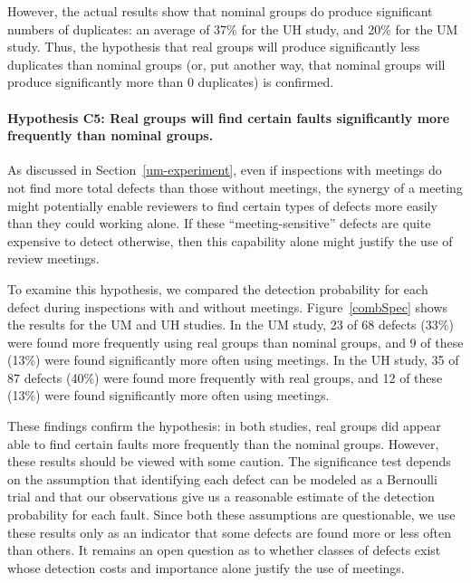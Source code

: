 However, the actual results show that nominal groups do produce significant
numbers of duplicates: an average of 37\% for the UH study, and 20\% for
the UM study.  Thus, the hypothesis that real groups will produce
significantly less duplicates than nominal groups (or, put another way,
that nominal groups will produce significantly more than 0 duplicates) is
confirmed.



\paragraph{Hypothesis C5: Real groups will find certain faults significantly more frequently than nominal groups.}

As discussed in Section~\ref{um-experiment}, even if inspections with
meetings do not find more total defects than those without meetings, the synergy
of a meeting might potentially enable reviewers to find certain types of
defects more easily than they could working alone.  If these
``meeting-sensitive'' defects are quite expensive to detect otherwise, then
this capability alone might justify the use of review meetings.

To examine this hypothesis, we compared the detection probability for each
defect during inspections with and without meetings. Figure~\ref{combSpec} 
shows the results for the UM and UH studies.  In the UM study, 23 of 68
defects (33\%) were found more frequently using real groups than nominal
groups, and 9 of these (13\%) were found significantly more often using
meetings.  In the UH study, 35 of 87 defects (40\%) were found more
frequently with real groups, and 12 of these (13\%) were found
significantly more often using meetings.

These findings confirm the hypothesis: in both studies, real groups did
appear able to find certain faults more frequently than the nominal
groups.  However, these results should be viewed with some caution. 
The  significance test depends on the assumption that identifying each 
defect can be modeled as a Bernoulli trial and that our observations give
us a reasonable estimate of the detection probability for each fault.  Since
both these assumptions are questionable, we use these results only as an 
indicator that some defects are found more or less often than others.
It remains an open question as to whether classes of defects exist whose 
detection costs and importance alone justify the use of meetings. 


